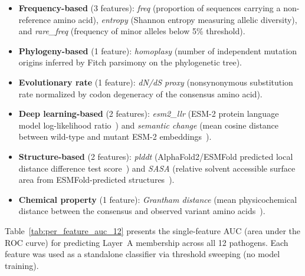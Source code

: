 \begin{itemize}
\item \textbf{Frequency-based} (3 features): \textit{freq} (proportion of sequences carrying a non-reference amino acid), \textit{entropy} (Shannon entropy measuring allelic diversity), and \textit{rare\_freq} (frequency of minor alleles below 5\% threshold).
\item \textbf{Phylogeny-based} (1 feature): \textit{homoplasy} (number of independent mutation origins inferred by Fitch parsimony on the phylogenetic tree).
\item \textbf{Evolutionary rate} (1 feature): \textit{dN/dS proxy} (nonsynonymous substitution rate normalized by codon degeneracy of the consensus amino acid).
\item \textbf{Deep learning-based} (2 features): \textit{esm2\_llr} (ESM-2 protein language model log-likelihood ratio~\cite{lin2023esm2,rives2021biological}) and \textit{semantic change} (mean cosine distance between wild-type and mutant ESM-2 embeddings~\cite{hie2021learning}).
\item \textbf{Structure-based} (2 features): \textit{plddt} (AlphaFold2/ESMFold predicted local distance difference test score~\cite{jumper2021alphafold}) and \textit{SASA} (relative solvent accessible surface area from ESMFold-predicted structures~\cite{shrake1973environment}).
\item \textbf{Chemical property} (1 feature): \textit{Grantham distance} (mean physicochemical distance between the consensus and observed variant amino acids~\cite{grantham1974amino}).
\end{itemize}

Table~\ref{tab:per_feature_auc_12} presents the single-feature AUC (area under the ROC curve) for predicting Layer~A membership across all 12 pathogens. Each feature was used as a standalone classifier via threshold sweeping (no model training).


